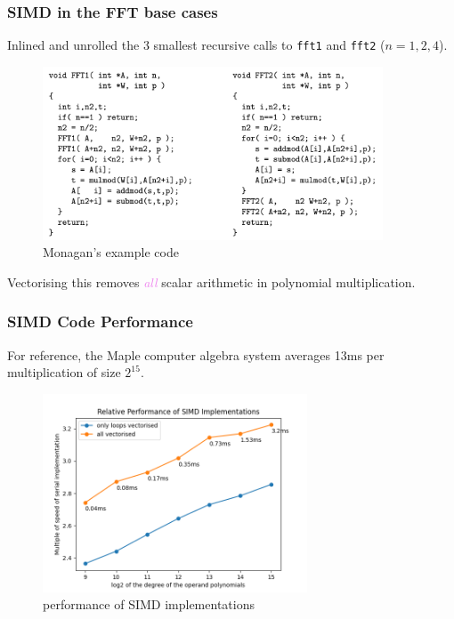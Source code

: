 \documentclass{beamer}
\newcommand{\its}[1]{\textcolor{violet}{\emph{#1}}}
\begin{document}
\begin{frame}
    \frametitle{SIMD in the FFT base cases}

    Inlined and unrolled the 3 smallest recursive calls to \lstinline{fft1} and
    \lstinline{fft2} ($n = 1,2,4$). 

    \begin{figure}[h]
        \centering
        \includegraphics[width=0.9\textwidth]{monagan.png}
        \caption{Monagan's example code \cite{monagan}}
    \end{figure}

    \pause \vfill

    Vectorising this removes \its{all} scalar arithmetic in polynomial
    multiplication.
\end{frame}

\begin{frame}
    \frametitle{SIMD Code Performance}

    For reference, the Maple computer algebra system averages 13ms per
    multiplication of size $2^{15}$.

    \vfill

    \begin{figure}
        \centering
        \includegraphics[width=0.7\textwidth]{avx_perf.png}
        \caption{performance of SIMD implementations}
    \end{figure}

\end{frame}
\end{document}
